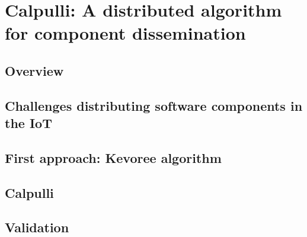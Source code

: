 \chapter{Calpulli: A distributed algorithm for component dissemination}
\label{sec:Calpulli}

\section{Overview}

\section{Challenges distributing software components in the IoT}

\section{First approach: Kevoree algorithm}

\section{Calpulli}

\section{Validation}
